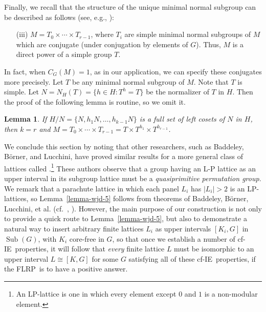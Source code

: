 \documentclass[11pt]{amsart}
\theoremstyle{plain}
\newtheorem{lemma}[theorem]{Lemma}
\theoremstyle{definition}
\theoremstyle{remark}
\numberwithin{theorem}{section}
\numberwithin{claim}{section}
\numberwithin{equation}{section}
\numberwithin{conjecture}{section}
\newcommand{\<}{\ensuremath{\langle}}
\renewcommand{\>}{\ensuremath{\rangle}}
\newcommand{\Sub}{\ensuremath{\operatorname{Sub}}}
\newcommand{\FLRP}{{\small FLRP}}
\newcommand{\0}{\ensuremath{\mathbf{0}}}
\newcommand{\1}{\ensuremath{\mathbf{1}}}
\newcommand{\2}{\ensuremath{\mathbf{2}}}
\newcommand{\3}{\ensuremath{\mathbf{3}}}
\newcommand{\4}{\ensuremath{\mathbf{4}}}
\newcommand{\5}{\ensuremath{\mathbf{5}}}
\newcommand{\IE}{{\small IE}}
\begin{document}
Finally, we recall that the structure of the unique minimal normal subgroup can be
described as follows (see, e.g., \cite[Theorem 4.3.A]{Dixon:1996}):
\begin{enumerate}[(i)]
\item[(iii)] $M = T_0\times \cdots \times T_{r-1}$, where $T_i$ are simple minimal normal subgroups of
  $M$ which are conjugate (under conjugation by elements of $G$). Thus, $M$ is a
  direct power of a simple group $T$.
\end{enumerate}
  In fact, when $C_G(M)=1$, as in our application,
we can specify these conjugates more precisely. %
Let $T$ be any minimal normal subgroup of $M$. Note that $T$ is simple.
Let $N = N_H(T) = \{h\in H : T^h = T\}$ be the normalizer of $T$ in
$H$.  Then the proof of the following lemma is routine, so we omit it.
\begin{lemma}
If $H/N = \{N, h_1N, \dots, h_{k-1}N\}$ is a full set of left cosets of $N$
in $H$, then $k=r$ and $M = T_0\times \cdots \times T_{r-1} = T \times
T^{h_1} \times T^{h_{r-1}}$. 
\end{lemma}

We conclude this section by noting that other researchers, such as Baddeley,
B\"orner, and Lucchini, have proved similar results 
for a more general class of lattices called 
.\footnote{An LP-lattice is one in which
  every element except $0$ and $1$ is a non-modular element.}
These authors observe that a group having an L-P lattice as an upper
interval in its subgroup lattice must be a \emph{quasiprimitive permutation group}. 
We remark that a parachute lattice in which each panel
 $L_i$ has $|L_i|>2$ is an LP-lattices, so
Lemma~\ref{lemma-wjd-5} follows from
theorems of Baddeley, B\"orner, Lucchini, et al. 
(cf.~\cite{Lucchini:1997}, \cite{Borner:1999}).
However, the main purpose of our construction is not only to
provide a quick route to Lemma~\ref{lemma-wjd-5}, but also to
demonstrate a natural way to insert arbitrary finite lattices
$L_i$ as upper intervals $[K_i, G]$ in $\Sub(G)$, with $K_i$ core-free in
$G$, so that once we establish a number of cf-\IE\ properties,
it will follow that \emph{every} finite lattice $L$ must be isomorphic to an upper
interval $L \cong [K, G]$ for some $G$ satisfying all of these cf-\IE\ properties,
if the \FLRP\ is to have a positive answer.   
\end{document}
